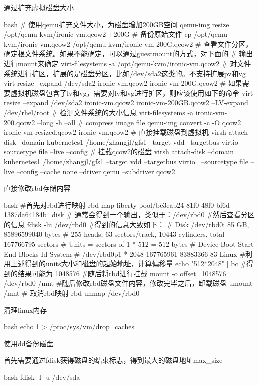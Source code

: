 \begin{outline}[enumerate]
\1 通过扩充虚拟磁盘大小
\begin{code-block}{bash}
# 使用qemu扩充文件大小，为磁盘增加200GB空间
qemu-img resize /opt/qemu-kvm/ironic-vm.qcow2 +200G
# 备份原始文件
cp /opt/qemu-kvm/ironic-vm.qcow2 /opt/qemu-kvm/ironic-vm-200G.qcow2
# 查看文件分区，确定根文件系统。如果不能确定，可以通过guestmount的方式，对下面的
# 输出进行mount来确定
virt-filesystems -a /opt/qemu-kvm/ironic-vm.qcow2
# 对文件系统进行扩区，扩展的是磁盘分区，比如/dev/sda2这类的。不支持扩展pv和vg
virt-resize --expand /dev/sda2 ironic-vm.qcow2 ironic-vm-200G.qcow2
# 如果需要虚拟机磁盘包含了lv和vg，需要对lv和vg进行扩区，则应该使用如下的命令
virt-resize --expand /dev/sda2 ironic-vm.qcow2 ironic-vm-200GB.qcow2 --LV-expand /dev/rhel/root
# 检测文件系统的大小信息
virt-filesystems -a ironic-vm-200.qcow2 --long -h --all
# compress image file
qemu-img convert -c -O qcow2 ironic-vm-resized.qcow2 ironic-vm.qcow2
# 直接挂载磁盘到虚拟机
virsh attach-disk --domain kubernetes1  /home/zhangjl/gfs1 --target vdd --targetbus virtio  \
    --sourcetype file --live --config
# 挂载qcow2的磁盘
virsh attach-disk --domain kubernetes1  /home/zhangjl/gfs1 --target vdd --targetbus virtio  \
    --sourcetype file --live --config --cache none --driver qemu --subdriver qcow2
\end{code-block}

\1 直接修改rbd存储内容
\begin{code-block}{bash}
#首先对rbd进行映射
rbd map liberty-pool/be3eab24-81f0-48f0-bf6d-1387da64184b_disk
# 通常会得到一个输出，类似于：/dev/rbd0
#然后查看分区的信息
fdisk -lu /dev/rbd0
#得到的信息大致如下：
# Disk /dev/rbd0: 85 GB, 85896599040 bytes
# 255 heads, 63 sectors/track, 10443 cylinders, total 167766795 sectors
# Units = sectors of 1 * 512 = 512 bytes
#     Device Boot      Start         End      Blocks   Id  System
# /dev/rbd0p1   *        2048   167765961    83883366   83  Linux
#利用上述得到的units大小和磁盘的起始地址，计算偏移量
echo "512*2048" | bc
#得到的结果可能为 1048576
#随后将rbd进行挂载
mount -o offset=1048576 /dev/rbd0 /mnt
#随后修改rbd磁盘文件内容，修改完毕之后，卸载磁盘
umount /mnt
# 取消rbd映射
rbd unmap /dev/rbd0
\end{code-block}

\1 清理linux内存
\begin{code-block}{bash}
echo 1 > /proc/sys/vm/drop_caches
\end{code-block}

\1 使用dd备份磁盘

首先需要通过fdisk获得磁盘的结束标志，得到最大的磁盘地址max\_size
\begin{code-block}{bash}
fdisk -l -u /dev/sda
\end{code-block}


\end{outline}

